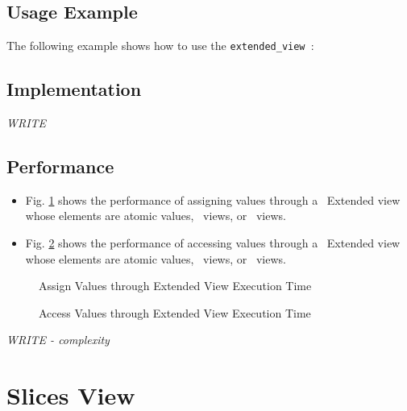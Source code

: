 \subsection{Usage Example} \label{sec-ext-vw-use}

The following example shows how to use the \texttt{extended\_view }:


\subsection{Implementation} \label{sec-ext-vw-impl}

\textit{WRITE}

\subsection{Performance} \label{sec-ext-vw-perf}

\begin{itemize}
\item
Fig. \ref{fig:ext-vw-assign-exper}
shows the performance of assigning values through a \stapl\ Extended view
whose elements are atomic values, \stl\ views, or \stapl\ views.
\item
Fig. \ref{fig:ext-vw-access-exper}
shows the performance of accessing values through a \stapl\ Extended view
whose elements are atomic values, \stl\ views, or \stapl\ views.
\end{itemize}

\begin{figure}[p]
\caption{Assign Values through Extended View Execution Time}
\label{fig:ext-vw-assign-exper}
\end{figure}

\begin{figure}[p]
\caption{Access Values through Extended View Execution Time}
\label{fig:ext-vw-access-exper}
\end{figure}

\emph{WRITE - complexity}


\section{Slices View} \label{sec-slices-vw}

